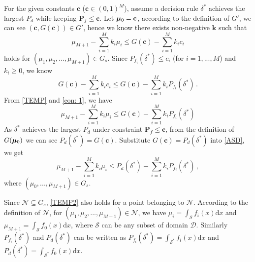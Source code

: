 For the given constants $\mathbf{c}$ ($\mathbf{c} \in (0, 1)^M$), 
 assume a decision rule $\delta^\ast$  achieves the largest $P_d$  while keeping $\mathbf{P}_f \leq \mathbf{c}$. 
Let $\boldsymbol{\mu}_0 = \mathbf{c}$, according to the definition of $G'$, we can see $(\mathbf{c},G(\mathbf{c})) \in G'$, hence we know there exists non-negative $\mathbf{k}$ such that 
\begin{equation}
\label{TEMP}
\mu_{M+1} - \sum_{i=1}^{M}k_i\mu_i \leq G(\mathbf{c}) - \sum_{i=1}^{M}k_ic_i
\end{equation}
holds for $(\mu_1, \mu_2, ..., \mu_{M+1}) \in G_s$.
Since $P_{f_i}(\delta^\ast) \leq c_i$ (for $i=1, ..., M$) and $k_i \geq 0$, we know
\begin{equation}
\label{con: 1}
 G(\mathbf{c}) - \sum_{i=1}^{M}k_ic_i \leq G(\mathbf{c}) - \sum_{i=1}^{M}k_iP_{f_i}(\delta^\ast)\,.
\end{equation}
From \eqref{TEMP} and \eqref{con: 1}, we have 
\begin{equation}
\label{ASD}
 \mu_{M+1} - \sum_{i=1}^{M}k_i\mu_i \leq G(\mathbf{c}) - \sum_{i=1}^{M}k_iP_{f_i}(\delta^\ast)
\end{equation}
As $\delta^\ast $ achieves the largest $P_d$ under constraint $\mathbf{P}_f \leq \mathbf{c}$, from the definition of $G(\boldsymbol{\mu}_0)$ we can see $P_{d}(\delta^\ast) = G(\mathbf{c})$. 
Substitute $G(\mathbf{c}) = P_d(\delta^\ast)$ into \eqref{ASD},  we get 
\begin{equation}
\label{TEMP2}
\mu_{M+1} - \sum_{i=1}^{M}k_i\mu_i \leq P_d(\delta^\ast) - \sum_{i=1}^{M}k_iP_{f_i}(\delta^\ast)\,,
\end{equation}
where $(\mu_0, ..., \mu_{M+1}) \in G_s$.

Since $\mathcal{N} \subseteq G_s$, \eqref{TEMP2} also holds for a point belonging to $\mathcal{N}$.
According to the definition of $\mathcal{N}$, for $(\mu_1, \mu_2, ..., \mu_{M+1}) \in \mathcal{N}$, we have  
$\mu_i = \int_{\mathcal{S}}f_i(x)\mathrm{d}x$ and $
\mu_{M+1} = \int_{\mathcal{S}}f_{0}(x)\mathrm{d}x$,  
where $\mathcal{S}$ can be any subset of domain $\mathcal{D}$. 
Similarly 
$P_{f_i}(\delta^\ast)$ and $P_{d}(\delta^\ast)$ can be written as
$P_{f_i}(\delta^\ast) = \int_{\mathcal{S}^\ast}f_i(x)\mathrm{d}x$ and $
P_d(\delta^\ast) = \int_{\mathcal{S}^\ast}f_0(x)\mathrm{d}x$.

